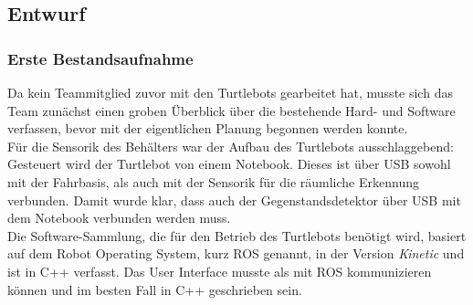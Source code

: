\documentclass[a4paper,12pt,headsepline]{scrartcl}
\begin{document}
	\subsection{Entwurf}
	\subsubsection{Erste Bestandsaufnahme}
		Da kein Teammitglied zuvor mit den Turtlebots gearbeitet hat, musste sich das Team zunächst einen groben Überblick über die bestehende Hard- und Software verfassen, bevor mit der eigentlichen Planung begonnen werden konnte.\\
		Für die Sensorik des Behälters war der Aufbau des Turtlebots ausschlaggebend: Gesteuert wird der Turtlebot von einem Notebook. Dieses ist über USB sowohl mit der Fahrbasis, als auch mit der Sensorik für die räumliche Erkennung verbunden. Damit wurde klar, dass auch der Gegenstandsdetektor über USB mit dem Notebook verbunden werden muss. \\
		Die Software-Sammlung, die für den Betrieb des Turtlebots benötigt wird, basiert auf dem \glqq Robot Operating System\grqq , kurz ROS genannt, in der Version \textit{Kinetic} und ist in C++ verfasst. Das User Interface musste als mit ROS kommunizieren können und im besten Fall in C++ geschrieben sein.
\end{document}
